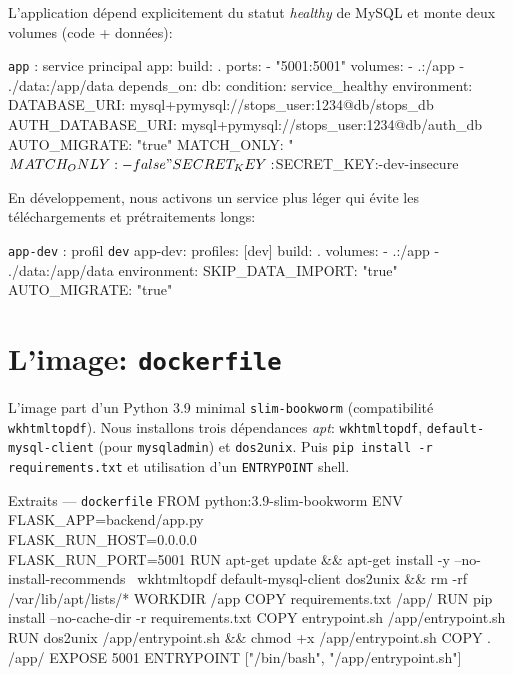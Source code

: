 \noindent L'application dépend explicitement du statut \textit{healthy} de MySQL et monte deux volumes (code + données):

\begin{codebox}[language=yaml]{\texttt{app} : service principal}
  app:
    build: .
    ports:
      - "5001:5001"
    volumes:
      - .:/app
      - ./data:/app/data
    depends_on:
      db:
        condition: service_healthy
    environment:
      DATABASE_URI: mysql+pymysql://stops_user:1234@db/stops_db
      AUTH_DATABASE_URI: mysql+pymysql://stops_user:1234@db/auth_db
      AUTO_MIGRATE: "true"
      MATCH_ONLY: "${MATCH_ONLY:-false}"
      SECRET_KEY: ${SECRET_KEY:-dev-insecure}
\end{codebox}

\noindent En développement, nous activons un service plus léger qui évite les téléchargements et prétraitements longs:

\begin{codebox}[language=yaml]{\texttt{app-dev} : profil \texttt{dev}}
  app-dev:
    profiles: [dev]
    build: .
    volumes:
      - .:/app
      - ./data:/app/data
    environment:
      SKIP_DATA_IMPORT: "true"
      AUTO_MIGRATE: "true"
\end{codebox}

\section{L'image: \texttt{dockerfile}}

L'image part d'un Python 3.9 minimal \texttt{slim-bookworm} (compatibilité \texttt{wkhtmltopdf}). Nous installons trois dépendances \textit{apt}: \texttt{wkhtmltopdf}, \texttt{default-mysql-client} (pour \texttt{mysqladmin}) et \texttt{dos2unix}. Puis \texttt{pip install -r requirements.txt} et utilisation d'un \texttt{ENTRYPOINT} shell.

\begin{codebox}[language=bash]{Extraits — \texttt{dockerfile}}
FROM python:3.9-slim-bookworm
ENV FLASK_APP=backend/app.py \\
    FLASK_RUN_HOST=0.0.0.0 \\
    FLASK_RUN_PORT=5001
RUN apt-get update && apt-get install -y --no-install-recommends \
    wkhtmltopdf default-mysql-client dos2unix && rm -rf /var/lib/apt/lists/*
WORKDIR /app
COPY requirements.txt /app/
RUN pip install --no-cache-dir -r requirements.txt
COPY entrypoint.sh /app/entrypoint.sh
RUN dos2unix /app/entrypoint.sh && chmod +x /app/entrypoint.sh
COPY . /app/
EXPOSE 5001
ENTRYPOINT ["/bin/bash", "/app/entrypoint.sh"]
\end{codebox}

